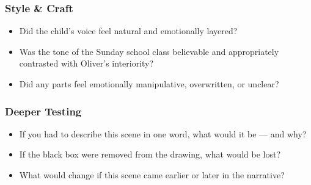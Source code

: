 \subsubsection*{Style \& Craft}

\begin{itemize}
  \item Did the child’s voice feel natural and emotionally layered?
  \item Was the tone of the Sunday school class believable and appropriately contrasted with Oliver’s interiority?
  \item Did any parts feel emotionally manipulative, overwritten, or unclear?
\end{itemize}

\subsubsection*{Deeper Testing}

\begin{itemize}
  \item If you had to describe this scene in one word, what would it be — and why?
  \item If the black box were removed from the drawing, what would be lost?
  \item What would change if this scene came earlier or later in the narrative?
\end{itemize}
